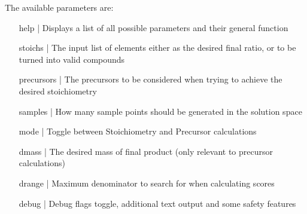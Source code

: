 The available parameters are:
\begin{enumerate}[label = {}, leftmargin=\widthof{precursors |}+\labelsep]
	\item[help |] Displays a list of all possible parameters and their general function
	\item[stoichs |] The input list of elements either as the desired final ratio, or to be turned into valid compounds
	\item[precursors |] The precursors to be considered when trying to achieve the desired stoichiometry
	\item[samples |] How many sample points should be generated in the solution space
	\item[mode |] Toggle between Stoichiometry and Precursor calculations
	\item[dmass |] The desired mass of final product (only relevant to precursor calculations)
	\item[drange |] Maximum denominator to search for when calculating scores
	\item[debug |] Debug flags toggle, additional text output and some safety features
\end{enumerate}